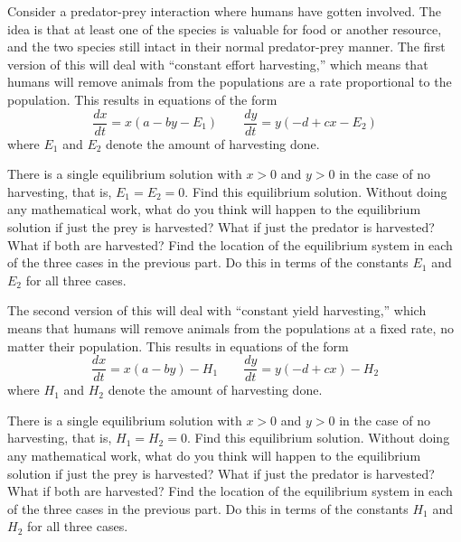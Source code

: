 \documentclass{ximera}
\begin{document}
\begin{exercise}
    Consider a predator-prey interaction where humans have gotten involved. The idea is that at least one of the species is valuable for food or another resource, and the two species still intact in their normal predator-prey manner. The first version of this will deal with ``constant effort harvesting,'' which means that humans will remove animals from the populations are a rate proportional to the population. This results in equations of the form
    \[ 
        \frac{dx}{dt} = x(a - by - E_1) \qquad \frac{dy}{dt} = y(-d + cx - E_2) 
    \] 
    where $E_1$ and $E_2$ denote the amount of harvesting done.
    \begin{tasks}
        \task There is a single equilibrium solution with $x > 0$ and $y>0$ in the case of no harvesting, that is, $E_1 = E_2 = 0$. Find this equilibrium solution.
        \task Without doing any mathematical work, what do you think will happen to the equilibrium solution if just the prey is harvested? What if just the predator is harvested? What if both are harvested?
        \task Find the location of the equilibrium system in each of the three cases in the previous part. Do this in terms of the constants $E_1$ and $E_2$ for all three cases. 
    \end{tasks}
\end{exercise}

\begin{exercise}
    The second version of this will deal with ``constant yield harvesting,'' which means that humans will remove animals from the populations at a fixed rate, no matter their population. This results in equations of the form
    \[ 
        \frac{dx}{dt} = x(a - by) - H_1 \qquad \frac{dy}{dt} = y(-d + cx) - H_2 
    \] 
    where $H_1$ and $H_2$ denote the amount of harvesting done.
    \begin{tasks}
        \task There is a single equilibrium solution with $x > 0$ and $y>0$ in the case of no harvesting, that is, $H_1 = H_2 = 0$. Find this equilibrium solution.
        \task Without doing any mathematical work, what do you think will happen to the equilibrium solution if just the prey is harvested? What if just the predator is harvested? What if both are harvested?
        \task Find the location of the equilibrium system in each of the three cases in the previous part. Do this in terms of the constants $H_1$ and $H_2$ for all three cases. 
    \end{tasks}
\end{exercise}
\end{document}
